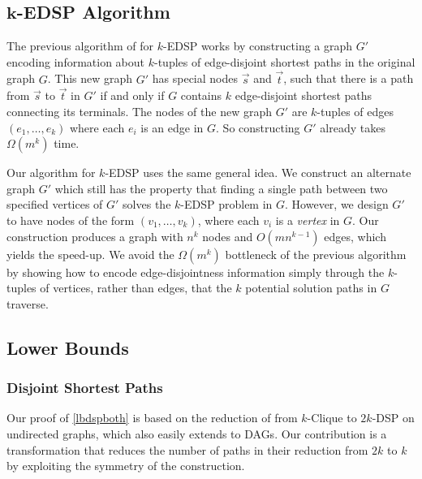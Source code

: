 \documentclass[11pt]{article}
\theoremstyle{definition}
\begin{document}
\subsection{\texorpdfstring{$\boldsymbol{k}$}{k}-EDSP Algorithm}

The previous algorithm of \cite[Proposition 10]{BercziKobayashi2017} for \textsf{$k$-EDSP} works by constructing a graph $G'$ encoding information about $k$-tuples of edge-disjoint shortest paths in the original graph $G$.
This new graph $G'$ has special nodes $\vec{s}$ and $\vec{t}$, such that there is a path from $\vec{s}$ to $\vec{t}$ in $G'$ if and only if $G$ contains $k$ edge-disjoint shortest paths connecting its terminals.
The nodes of the new graph $G'$ are $k$-tuples of edges $(e_1, \dots, e_k)$ where each $e_i$ is an edge in $G$.
So constructing $G'$ already takes $\Omega(m^k)$ time.

Our algorithm for \textsf{$k$-EDSP} uses the same general idea.
We construct an alternate graph $G'$ which still has the property that finding a single path between two specified vertices of $G'$ solves the \textsf{$k$-EDSP} problem in $G$.
However, we design $G'$ to have nodes of the form $(v_1, \dots, v_k)$, where each $v_i$ is a \emph{vertex} in $G$.
Our construction produces a graph with $n^k$ nodes and $O(mn^{k-1})$ edges, which yields the speed-up. 
We avoid the $\Omega(m^k)$ bottleneck of the previous algorithm by showing how to encode edge-disjointness information simply through the $k$-tuples of vertices, rather than edges, that the $k$ potential solution paths in $G$ traverse.



\subsection{Lower Bounds}

\subsubsection*{Disjoint Shortest Paths}

Our proof of \cref{lbdspboth} is based on the reduction of 
\cite[Proposition 1]{Geometric-Lens} from \textsf{$k$-Clique} to $2k$-\textsf{DSP} on undirected graphs, which also easily extends to DAGs. %
Our contribution is a transformation that reduces the number of paths in their reduction from $2k$ to $k$ by exploiting the symmetry of the construction. 
\end{document}
